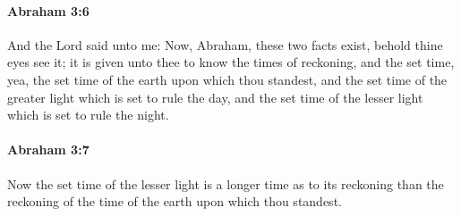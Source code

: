 		\paragraph{Abraham 3:6} %
			\label{ABRAHAM-3-6}

			And the Lord said unto me: Now, Abraham, these two facts exist, behold thine eyes see it; it is given unto thee to know the times of reckoning, and the set time, yea, the set time of the earth upon which thou standest, and the set time of the greater light which is set to rule the day, and the set time of the lesser light which is set to rule the night.


		\paragraph{Abraham 3:7} %
			\label{ABRAHAM-3-7}

			Now the set time of the lesser light is a longer time as to its reckoning than the reckoning of the time of the earth upon which thou standest.


